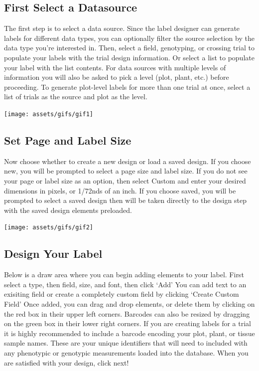\documentclass[
  12pt,
]{book}
\begin{document}
\hypertarget{first-select-a-datasource}{%
\subsection{First Select a Datasource}\label{first-select-a-datasource}}

The first step is to select a data source. Since the label designer can generate labels for different data types, you can optionally filter the source selection by the data type you're interested in. Then, select a field, genotyping, or crossing trial to populate your labels with the trial design information. Or select a list to populate your label with the list contents. For data sources with multiple levels of information you will also be asked to pick a level (plot, plant, etc.) before proceeding. To generate plot-level labels for more than one trial at once, select a list of trials as the source and plot as the level.

\begin{center}\texttt{[image: assets/gifs/gif1]} \end{center}

\hypertarget{set-page-and-label-size}{%
\subsection{Set Page and Label Size}\label{set-page-and-label-size}}

Now choose whether to create a new design or load a saved design. If you choose new, you will be prompted to select a page size and label size. If you do not see your page or label size as an option, then select Custom and enter your desired dimensions in pixels, or 1/72nds of an inch. If you choose saved, you will be prompted to select a saved design then will be taken directly to the design step with the saved design elements preloaded.

\begin{center}\texttt{[image: assets/gifs/gif2]} \end{center}

\hypertarget{design-your-label}{%
\subsection{Design Your Label}\label{design-your-label}}

Below is a draw area where you can begin adding elements to your label. First select a type, then field, size, and font, then click `Add' You can add text to an exisiting field or create a completely custom field by clicking `Create Custom Field' Once added, you can drag and drop elements, or delete them by clicking on the red box in their upper left corners. Barcodes can also be resized by dragging on the green box in their lower right corners. If you are creating labels for a trial it is highly recommended to include a barcode encoding your plot, plant, or tissue sample names. These are your unique identifiers that will need to included with any phenotypic or genotypic measurements loaded into the database. When you are satisfied with your design, click next!
\end{document}
